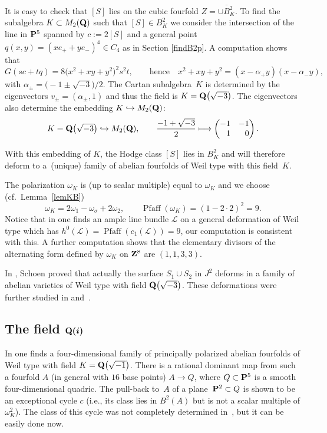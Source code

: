 \documentclass[pdftex]{sigma}
\numberwithin{equation}{section}
\begin{document}
It is easy to check that $[S]$ lies on the cubic fourfold $Z=\overline{\cup B^2_K}$.
To find the subalgebra $K\subset M_2({\bf Q})$ such that $[S]\in B^2_K$
we consider the intersection of the line in ${\bf P}^5$
spanned by $c:=2[S]$ and a general point $q(x,y)=(xe_++ye_-)^4 \in C_4$ as in Section \ref{findB2p}.
A computation shows that
\[
G(sc+tq)=8\big(x^2+xy+y^2\big)^2s^2t,\qquad\text{hence}\quad
x^2+xy+y^2 = (x-\alpha_+y)(x-\alpha_-y),
\]
with $\alpha_\pm=\big({-}1\pm\sqrt{-3}\big)/2$. The Cartan subalgebra~$K$ is
determined by the eigenvectors $v_{\pm}=(\alpha_\pm,1)$ and thus the
field is $K={\bf Q}\big(\sqrt{-3}\big)$. The eigenvectors also determine the embedding
$K\hookrightarrow M_2({\bf Q})$:
\[
K = {\bf Q}\big(\sqrt{-3}\big) \hookrightarrow M_2({\bf Q}),\qquad
\frac{-1+\sqrt{-3}}{2} \longmapsto \left(\begin{matrix}-1&-1\\ \hphantom{-}1&\hphantom{-}0\end{matrix}\right).
\]

With this embedding of $K$, the Hodge class $[S]$ lies in $B^2_K$ and
will therefore deform to a~(unique) family of abelian fourfolds of
Weil type with this field~$K$.

The polarization $\omega_K$ is (up to scalar multiple)
equal to $\omega_K$ and we choose (cf.\ Lemma~\ref{lemKB})
\[
\omega_K = 2\omega_1 - \omega_\sigma + 2\omega_2,
\qquad\operatorname{Pfaff}(\omega_K) = (1-2\cdot 2)^2 = 9.
\]
Notice that in \cite[proof of Lemma~10.4]{schoen} one finds an ample line bundle
${\mathcal L}$ on a general deformation of Weil type which has
$h^0({\mathcal L})=\operatorname{Pfaff}(c_1({\mathcal L}))=9$,
our computation is consistent with this.
A further computation shows that the elementary divisors of the alternating form
defined by $\omega_K$ on ${\bf Z}^8$ are $(1,1,3,3)$.

In \cite{schoen}, Schoen proved that actually the surface $S_1\cup S_2$ in $J^2$ deforms
in a family of abelian varieties of Weil type with field ${\bf Q}\big(\sqrt{-3}\big)$. These deformations
were further studied in \cite{CMLR} and~\cite{RRS}.

\subsection[The field Q(i)]{The field $\boldsymbol{{\bf Q}(i)}$}\label{qi}
In \cite{vG} one finds a four-dimensional family of principally polarized
abelian fourfolds of Weil type with field $K={\bf Q}\big(\sqrt{-1}\big)$.
There is a rational dominant map from such a fourfold $A$
(in general with $16$ base points) $A\rightarrow Q$,
where $Q\subset {\bf P}^5$ is a smooth four-dimensional quadric.
The pull-back to~$A$ of a plane~${\bf P}^2\subset Q$ is shown to be an exceptional cycle $c$
(i.e., its class lies in $B^2(A)$ but is not a scalar multiple of $\omega_K^2$). The class of
this cycle was not completely determined in~\cite{vG}, but it can be easily done now.
\end{document}
